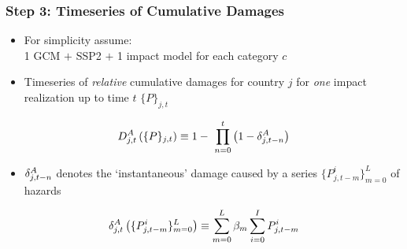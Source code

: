 \documentclass[
c,
11pt,
aspectratio=169, %
final,
]{beamer}
\begin{document}
\begin{frame}
  \frametitle{Step 3: Timeseries of Cumulative Damages}
      \begin{minipage}[l]{\linewidth}
        \begin{itemize}
  \item For simplicity assume:\\ 1 GCM $+$ SSP2 $+$ 1 impact model for each category $c$          
  \item Timeseries of \emph{relative} cumulative damages for country $j$ for \emph{one} impact realization up to time $t$ $\lbrace P\rbrace_{j,t}$  
  \end{itemize}
  \begin{equation*}
     \DA_{j,t}\left(\lbrace P\rbrace_{j,t}\right)\equiv 1 - \ \prod_{n=0}^{t}\left(1-\dA_{j,t-n}\right)
   \end{equation*}
   \begin{itemize}
\item  $\delta^A_{j,t-n}$ denotes the `instantaneous' damage caused by a series $\lbrace P_{j,t-m}^i\rbrace_{m=0}^L$ of hazards   
   \end{itemize}
  \begin{equation*}
    \delta^A_{j,t}\left(\lbrace P_{j,t-m}^i\rbrace_{m=0}^L\right)\equiv \sum_{m=0}^L\beta_m\sum_{i=0}^IP_{j,t-m}^i
  \end{equation*}

\end{minipage}\hfill
\begin{minipage}[r]{0\linewidth}
\end{minipage}
\end{frame}
\end{document}
